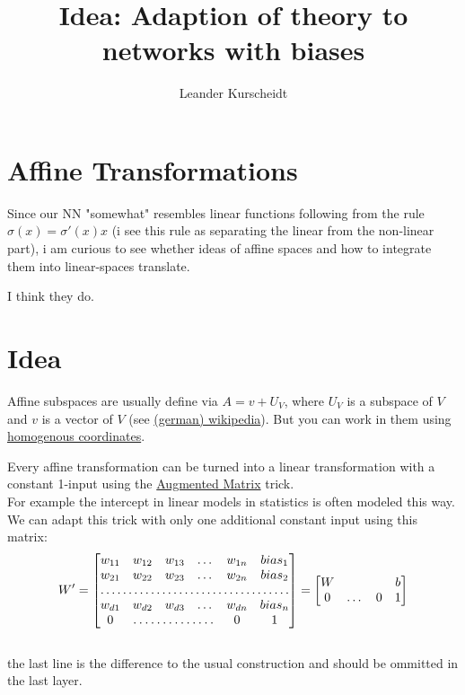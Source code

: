 \documentclass[a4paper]{article}
\title{Idea: Adaption of theory to networks with biases}
\author{Leander Kurscheidt}
\theoremstyle{definition}
\begin{document}
\maketitle
\begin{abstract}
\end{abstract}
\section{Affine Transformations}

Since our NN "somewhat" resembles linear functions following from the rule $\sigma(x)=\sigma'(x)x$ (i see this rule as separating the linear from the non-linear part),
i am curious to see whether ideas of affine spaces and how to integrate them into linear-spaces translate.

I think they do.

\section{Idea}

Affine subspaces are usually define via $A=v + U_V$, where $U_V$ is a subspace of $V$ and $v$ is a vector of $V$ (see \href{https://de.wikipedia.org/wiki/Affiner_Unterraum}{(german) wikipedia}). But you can work in them using \href{https://en.wikipedia.org/wiki/Homogeneous_coordinates}{homogenous coordinates}.

Every affine transformation can be turned into a linear transformation with a constant 1-input using the \href{https://en.wikipedia.org/wiki/Augmented_matrix}{Augmented Matrix} trick.\\
For example the intercept in linear models in statistics is often modeled this way. \\
We can adapt this trick with only one additional constant input using this matrix:
\[
W'=\begin{bmatrix}
    w_{11}       & w_{12} & w_{13} & \dots & w_{1n} & bias_1\\
    w_{21}       & w_{22} & w_{23} & \dots & w_{2n} & bias_2\\
    \hdotsfor{6} \\
	w_{d1}       & w_{d2} & w_{d3} & \dots & w_{dn} & bias_n\\
	0 & \hdotsfor{3} & 0 & 1
\end{bmatrix}
= 
\begin{bmatrix}
    W & & & b\\
	0 & \dots & 0 & 1
\end{bmatrix}
\]\\
the last line is the difference to the usual construction and should be ommitted in the last layer.\\
\end{document}
